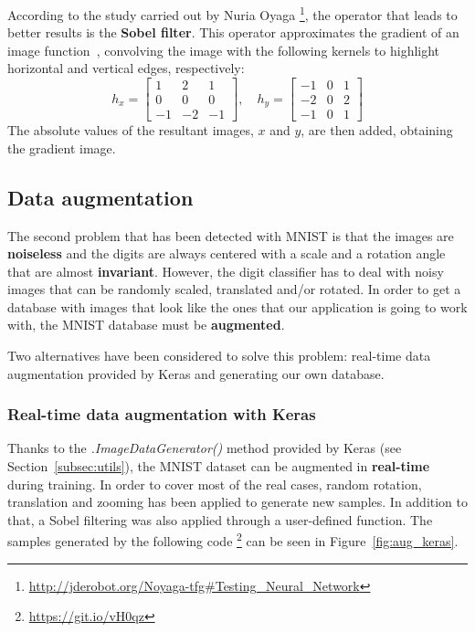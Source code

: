 According to the study carried out by Nuria Oyaga \footnote{\url{http://jderobot.org/Noyaga-tfg\#Testing\_Neural\_Network}}, the operator that leads to better results is the \textbf{Sobel filter}. This operator approximates the gradient of an image function~\cite{sonka1999image}, convolving the image with the following kernels to highlight horizontal and vertical edges, respectively:  
\begin{equation}\label{eq:sobel}
h_x = 
\begin{bmatrix}
1 & 2 & 1\\
0 & 0 & 0\\
-1 & -2 & -1
\end{bmatrix}
,\quad
h_y = 
\begin{bmatrix}
-1 & 0 & 1\\
-2 & 0 & 2\\
-1 & 0 & 1
\end{bmatrix}
\end{equation}
The absolute values of the resultant images, $x$ and $y$, are then added, obtaining the gradient image.

\subsection{Data augmentation}
The second problem that has been detected with MNIST is that the images are \textbf{noiseless} and the digits are always centered with a scale and a rotation angle that are almost \textbf{invariant}. However, the digit classifier has to deal with noisy images that can be randomly scaled, translated and/or rotated. In order to get a database with images that look like the ones that our application is going to work with, the MNIST database must be \textbf{augmented}.

Two alternatives have been considered to solve this problem: real-time data augmentation provided by Keras and generating our own database.

\subsubsection{Real-time data augmentation with Keras}
Thanks to the \textit{.ImageDataGenerator()} method provided by Keras (see Section~\ref{subsec:utils}), the MNIST dataset can be augmented in \textbf{real-time} during training. In order to cover most of the real cases, random rotation, translation and zooming has been applied to generate new samples. In addition to that, a Sobel filtering was also applied through a user-defined function. The samples generated by the following code \footnote{\url{https://git.io/vH0qz}} can be seen in Figure~\ref{fig:aug_keras}.

